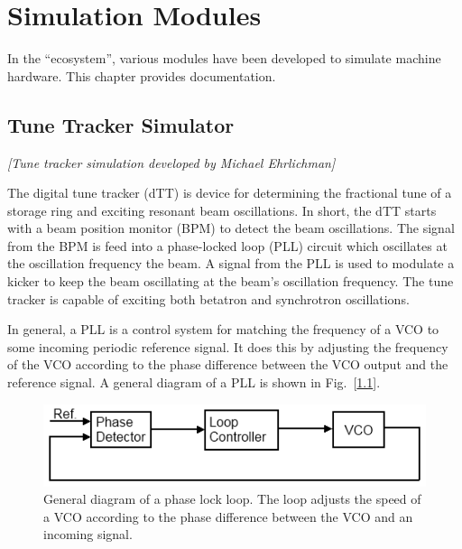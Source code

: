 \chapter{Simulation Modules}

In the \bmad ``ecosystem'', various modules have been developed to
simulate machine hardware. This chapter provides documentation.

\section{Tune Tracker Simulator}

\textit{\large [Tune tracker simulation developed by Michael Ehrlichman]}

The digital tune tracker (dTT) is device for determining the
fractional tune of a storage ring and exciting resonant beam
oscillations.  In short, the dTT starts with a beam position monitor
(BPM) to detect the beam oscillations. The signal from the BPM is feed
into a phase-locked loop (PLL) circuit which oscillates at the
oscillation frequency the beam. A signal from the PLL is used to
modulate a kicker to keep the beam oscillating at the beam's
oscillation frequency. The tune tracker is capable of exciting both
betatron and synchrotron oscillations.

In general, a PLL is a control system for matching the frequency of a
VCO to some incoming periodic reference signal.  It does this by
adjusting the frequency of the VCO according to the phase difference
between the VCO output and the reference signal.  A general diagram of
a PLL is shown in Fig.~[\ref{f:PLL}].

  \begin{figure}[ht]
  \centering
  \includegraphics{PLL.png}
  \caption[General diagram of a phase lock loop.]{
General diagram of a phase lock loop. The loop adjusts the speed of a
VCO according to the phase difference between the VCO and an incoming
signal.}
  \label{f:PLL}
  \end{figure}

